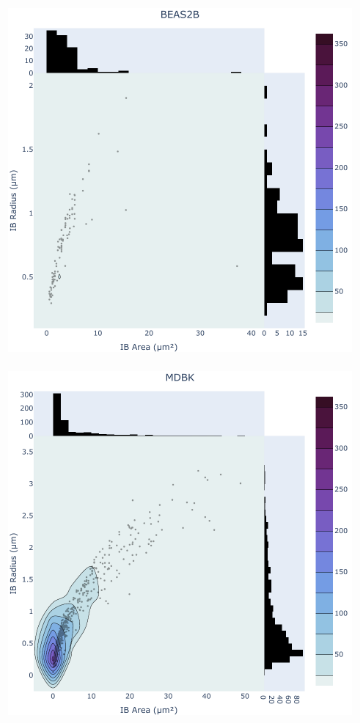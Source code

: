 \begin{figure}
    \medskip
    \begin{subfigure}{0.495\textwidth}
        \caption{}
        \includegraphics[width=\textwidth]{08. Chapter 3/Figs/01. Localisation introduction/04. heatmap_beas2b.pdf} 
    \end{subfigure}
    \hfill
    \begin{subfigure}{0.495\textwidth}
        \caption{}
        \includegraphics[width=\textwidth]{08. Chapter 3/Figs/01. Localisation introduction/05. heatmap_mdbk.pdf} 
    \end{subfigure}
    

\end{figure}
